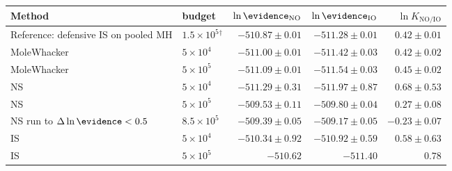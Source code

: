\begin{tabular}{@{}llrrr@{}}
  \toprule
  Method & budget & \(\ln\evidence_{\mathrm{NO}}\) & \(\ln\evidence_{\mathrm{IO}}\) & \(\ln K_{\mathrm{NO/IO}}\) \\
  \midrule
  Reference: defensive IS on pooled MH & \(1.5\times 10^{5}\)\(^{\dagger}\) & \(-510.87 \pm 0.01\) & \(-511.28 \pm 0.01\) & \(0.42 \pm 0.01\) \\
  \midrule
  MoleWhacker & \(5 \times 10^{4}\) & \(-511.00 \pm 0.01\) & \(-511.42 \pm 0.03\) & \(0.42 \pm 0.02\) \\
  MoleWhacker & \(5 \times 10^{5}\) & \(-511.09 \pm 0.01\) & \(-511.54 \pm 0.03\) & \(0.45 \pm 0.02\) \\
  NS & \(5 \times 10^{4}\) & \(-511.29 \pm 0.31\) & \(-511.97 \pm 0.87\) & \(0.68 \pm 0.53\) \\
  NS & \(5 \times 10^{5}\) & \(-509.53 \pm 0.11\) & \(-509.80 \pm 0.04\) & \(0.27 \pm 0.08\) \\
  NS run to \(\Delta\ln\evidence < 0.5\) & \(8.5\times 10^{5}\) & \(-509.39 \pm 0.05\) & \(-509.17 \pm 0.05\) & \(-0.23 \pm 0.07\) \\
  IS & \(5 \times 10^{4}\) & \(-510.34 \pm 0.92\) & \(-510.92 \pm 0.59\) & \(0.58 \pm 0.63\) \\
  IS & \(5 \times 10^{5}\) & \(-510.62\) & \(-511.40\) & \(0.78\) \\
  \bottomrule
\end{tabular}
